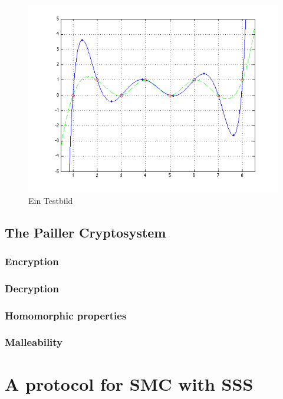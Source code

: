\documentclass[12pt,a4paper]{scrartcl}				%
\begin{document}
\begin{figure}[ht]
	\centering
	\includegraphics[scale=0.3]{test}
	\caption{Ein Testbild}
\end{figure}

\subsection{The Pailler Cryptosystem}

\subsubsection{Encryption}

\subsubsection{Decryption}

\subsubsection{Homomorphic properties}

\subsubsection{Malleability}

\section{A protocol for SMC with SSS}
\label{Design}
\end{document}

